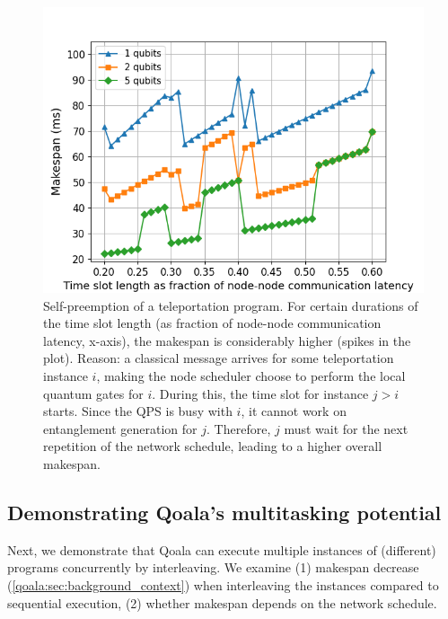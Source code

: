 \begin{figure}%
    \centering
    \includegraphics[width=1.0\columnwidth]{figures/qoala/teleport-self-preemption.png}
    \caption{Self-preemption of a teleportation program.
    For certain durations of the time slot length (as fraction of node-node communication latency, x-axis), the makespan is considerably higher (spikes in the plot).
    Reason: a classical message arrives for some teleportation instance $i$,
    making the node scheduler choose to perform the local quantum gates for $i$. During this,
    the time slot for instance $j > i$ starts. Since the QPS is busy with $i$, it cannot work on entanglement
    generation for $j$. Therefore, $j$ must wait for the next repetition of the network schedule, leading to a higher overall makespan.
    }
    \label{qoala:fig:teleport_self_preemption}
\end{figure}

\subsection{Demonstrating Qoala's multitasking potential}
Next, we demonstrate that Qoala can execute multiple instances of (different) programs concurrently by interleaving. We examine (1) makespan decrease (\cref{qoala:sec:background_context}) when interleaving the instances compared to sequential execution, %
(2) whether makespan depends on the network schedule.


